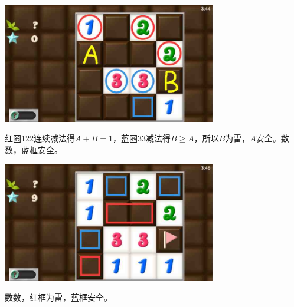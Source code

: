 \subsection{} %
\begin{center}
    \includegraphics[width=0.7\textwidth]{puzzlelow/161-1.jpg}
\end{center}
红圈122连续减法得$A+B=1$，蓝圈33减法得$B\ge A$，所以$B$为雷，$A$安全。数数，蓝框安全。
\begin{center}
    \includegraphics[width=0.7\textwidth]{puzzlelow/161-2.jpg}
\end{center}
数数，红框为雷，蓝框安全。

